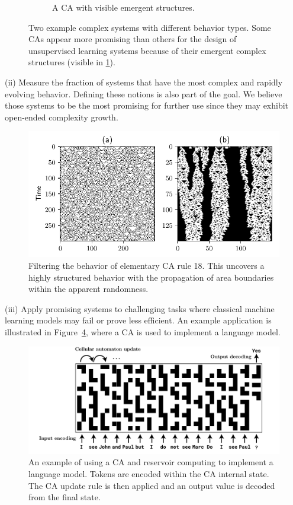 \begin{figure}[htbp]
\begin{subfigure}[b]{.4\linewidth}
  \caption{A \acl{CA} with visible emergent structures.}
  \label{fig:structured_sys}
\end{subfigure}
\caption{Two example complex systems with different behavior types. Some
  \aclp{CA} appear more promising than others for the design of unsupervised
  learning systems because of their emergent complex structures (visible in \ref{fig:structured_sys}).}
  \label{fig:comparison_ca}
\end{figure}

(ii) Measure the fraction of systems that have the most complex and rapidly
evolving behavior. Defining these notions is also part of the goal. We believe
those systems to be the most promising for further use since they may exhibit
open-ended complexity growth.

\begin{figure}[htbp]
  \centering
 \includegraphics[width=.9\linewidth]{figures/rule18_small}
 \caption{Filtering the behavior of elementary \acl{CA} rule 18. This
   uncovers a highly structured behavior with the propagation of area boundaries
   within the apparent randomness.}
  \label{fig:rule_18}
\end{figure}


(iii) Apply promising systems to challenging tasks where classical machine
learning models may fail or prove less efficient. An example application is
illustrated in Figure~\ref{fig:ca_lm}, where a \ac{CA} is used to
implement a language model.

\begin{figure}[htbp]
  \centering
  \includegraphics[width=.9\linewidth]{figures/ca_lm}
  \caption{An example of using a \acl{CA} and reservoir computing to implement a
    language model. Tokens are encoded within the \acl{CA} internal state. The
    \acl{CA} update rule is then applied and an output value is decoded from the
    final state.}
  \label{fig:ca_lm}
\end{figure}



